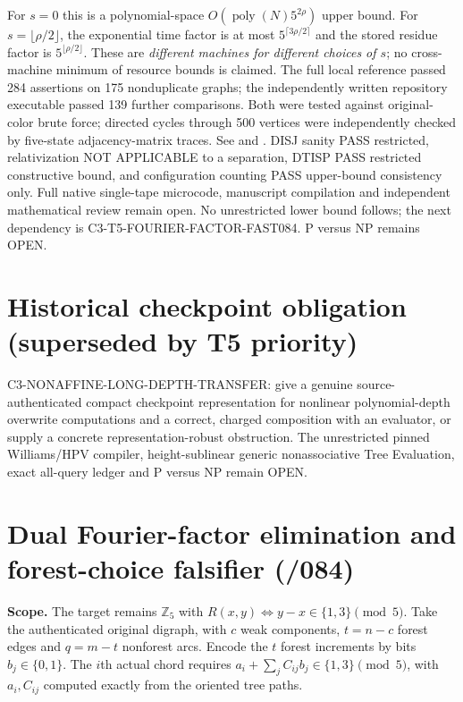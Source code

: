 \documentclass[11pt]{article}
\begin{document}
\noindent For $s=0$ this is a polynomial-space
$O(\operatorname{poly}(N)5^{2\rho})$ upper bound.
For $s=\lfloor\rho/2\rfloor$,
the exponential time factor is at most
$5^{\lceil3\rho/2\rceil}$ and the stored residue factor
is $5^{\lfloor\rho/2\rfloor}$.
These are \emph{different machines for different choices of $s$};
no cross-machine minimum of resource bounds is claimed.
The full local reference passed 284 assertions on 175 nonduplicate
graphs; the independently written repository executable passed
139 further comparisons. Both were tested against original-color
brute force; directed cycles through 500 vertices were independently
checked by five-state adjacency-matrix traces.
See 
and .
DISJ sanity PASS restricted, relativization NOT APPLICABLE to a
separation, DTISP PASS restricted constructive bound, and
configuration counting PASS upper-bound consistency only.
Full native single-tape microcode, manuscript compilation and
independent mathematical review remain open. No unrestricted
lower bound follows; the next dependency is
\textsc{C3-T5-FOURIER-FACTOR-FAST084}.
P versus NP remains OPEN.

\section{Historical checkpoint obligation (superseded by T5 priority)}
\textsf{C3-NONAFFINE-LONG-DEPTH-TRANSFER}: give a genuine
source-authenticated compact checkpoint representation for
nonlinear polynomial-depth overwrite computations and a
correct, charged composition with an evaluator, or supply
a concrete representation-robust obstruction. The unrestricted
pinned Williams/HPV compiler, height-sublinear generic
nonassociative Tree Evaluation, exact all-query ledger and
P versus NP remain OPEN.


\section{Dual Fourier-factor elimination and forest-choice falsifier (/084)}

\noindent\textbf{Scope.} The target remains $\mathbb Z_5$ with
$R(x,y)\Longleftrightarrow y-x\in\{1,3\}\pmod5$.
Take the authenticated original digraph, with $c$ weak components,
$t=n-c$ forest edges and $q=m-t$ nonforest arcs. Encode the $t$
forest increments by bits $b_j\in\{0,1\}$. The $i$th actual chord
requires $a_i+\sum_j C_{ij}b_j\in\{1,3\}\pmod5$, with
$a_i,C_{ij}$ computed exactly from the oriented tree paths.
\end{document}
